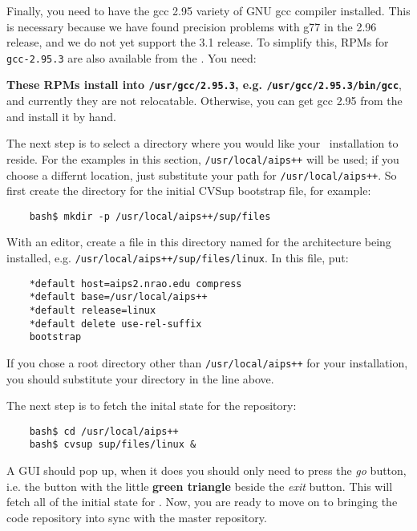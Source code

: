 Finally, you need to have the gcc 2.95 variety of GNU gcc compiler installed. This is
necessary because we have found precision problems with g77 in the 2.96 release, and
we do not yet support the 3.1 release. To simplify this, RPMs for \verb+gcc-2.95.3+
are also available from the
.
You need:
\begin{itemize}
\item \verb%gcc+2-2.95.3-52ds.i386.rpm%
\item \verb%gpp+2-2.95.3-52ds.i386.rpm%
\item \verb%libgpp+2-2.95.3-52ds.i386.rpm%
\item \verb%gppshare+2-2.95.3-52ds.i386.rpm%
\item \verb%g77+2-2.95.3-52ds.i386.rpm%
\end{itemize}
{\bf These RPMs install into \verb+/usr/gcc/2.95.3+, e.g. \verb+/usr/gcc/2.95.3/bin/gcc+}, and currently
they are not relocatable. Otherwise, you can get gcc 2.95 from the
 and
install it by hand.

The next step is to select a directory where you would like your \aipspp\ installation
to reside. For the examples in this section, {\tt /usr/local/aips++} will be
used; if you choose a differnt location, just substitute your path for
{\tt /usr/local/aips++}.  So first create the directory for the initial
CVSup bootstrap file, for example:
\begin{verbatim}
    bash$ mkdir -p /usr/local/aips++/sup/files
\end{verbatim}
With an editor, create a file in this directory named for the architecture
being installed, e.g. {\tt /usr/local/aips++/sup/files/linux}. In this file, put:
\begin{verbatim}
    *default host=aips2.nrao.edu compress
    *default base=/usr/local/aips++
    *default release=linux
    *default delete use-rel-suffix
    bootstrap
\end{verbatim}
If you chose a root directory other than {\tt /usr/local/aips++} for your
installation, you should substitute your directory in the line above.

The next step is to fetch the inital state for the repository:
\begin{verbatim}
    bash$ cd /usr/local/aips++
    bash$ cvsup sup/files/linux &
\end{verbatim}
A GUI should pop up, when it does you should only need to press the {\em go}
button, i.e. the button with the little {\bf green triangle} beside the 
{\em exit} button. This will fetch all of the initial state for \aipspp.
Now, you are ready to move on to bringing the code repository into sync
with the master repository.

